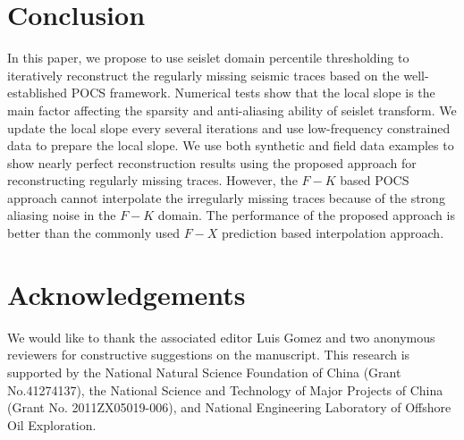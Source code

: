 
\section{Conclusion}
In this paper, we propose to use seislet domain percentile thresholding to iteratively reconstruct the regularly missing seismic traces based on the well-established POCS framework. Numerical tests show that the local slope is the main factor affecting the sparsity and anti-aliasing ability of seislet transform. %
We update the local slope every several iterations and use low-frequency constrained data to prepare the local slope. We use both synthetic and field data examples to show nearly perfect reconstruction results using the proposed approach for reconstructing regularly missing traces. However, the $F-K$ based POCS approach cannot interpolate the irregularly missing traces because of the strong aliasing noise in the $F-K$ domain. The performance of the proposed approach is better than the commonly used $F-X$ prediction based interpolation approach. 
 
\section{Acknowledgements}
We would like to thank the associated editor Luis Gomez and two anonymous reviewers for constructive suggestions on the manuscript. This research is supported by the National Natural Science Foundation of China (Grant No.41274137), the National Science and Technology of Major Projects of China (Grant No. 2011ZX05019-006), and National Engineering Laboratory of Offshore Oil Exploration.



